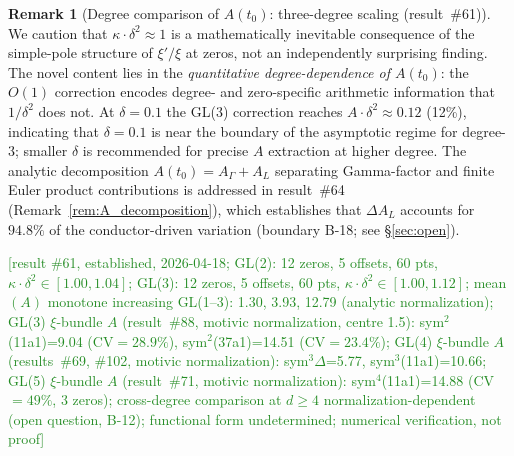 \documentclass[11pt, a4paper]{article}
\theoremstyle{definition}
\newtheorem{remark}{Remark}[section]
\theoremstyle{plain}
\begin{document}
\begin{remark}[Degree comparison of $A(t_0)$: three-degree scaling (result~\#61)]
We caution that $\kappa \cdot \delta^2 \approx 1$ is a mathematically
inevitable consequence of the simple-pole structure of $\xi'/\xi$ at zeros,
not an independently surprising finding.
The novel content lies in the \emph{quantitative degree-dependence of $A(t_0)$}:
the $O(1)$ correction encodes degree- and zero-specific arithmetic information
that $1/\delta^2$ does not.
At $\delta = 0.1$ the GL(3) correction reaches $A \cdot \delta^2 \approx 0.12$
(12\%), indicating that $\delta = 0.1$ is near the boundary of the asymptotic
regime for degree-3; smaller $\delta$ is recommended for precise $A$ extraction
at higher degree.
The analytic decomposition $A(t_0) = A_\Gamma + A_L$ separating Gamma-factor
and finite Euler product contributions is addressed in result~\#64
(Remark~\ref{rem:A_decomposition}), which establishes that $\Delta A_L$ accounts
for $94.8\%$ of the conductor-driven variation (boundary B-18; see \S\ref{sec:open}).

\textcolor{ForestGreen}{[result \#61, established, 2026-04-18;
GL(2): 12 zeros, 5 offsets, 60 pts, $\kappa{\cdot}\delta^2{\in}[1.00,1.04]$;
GL(3): 12 zeros, 5 offsets, 60 pts, $\kappa{\cdot}\delta^2{\in}[1.00,1.12]$;
mean$(A)$ monotone increasing GL(1--3): 1.30, 3.93, 12.79 (analytic normalization);
GL(3) $\xi$-bundle $A$ (result~\#88, motivic normalization, centre 1.5): sym$^2$(11a1)=9.04 (CV${=}28.9\%$), sym$^2$(37a1)=14.51 (CV${=}23.4\%$);
GL(4) $\xi$-bundle $A$ (results~\#69, \#102, motivic normalization): sym$^3\Delta$=5.77, sym$^3$(11a1)=10.66;
GL(5) $\xi$-bundle $A$ (result~\#71, motivic normalization): sym$^4$(11a1)=14.88 (CV${=}49\%$, 3 zeros);
cross-degree comparison at $d{\geq}4$ normalization-dependent (open question, B-12);
functional form undetermined; numerical verification, not proof]}
\end{remark}
\end{document}
